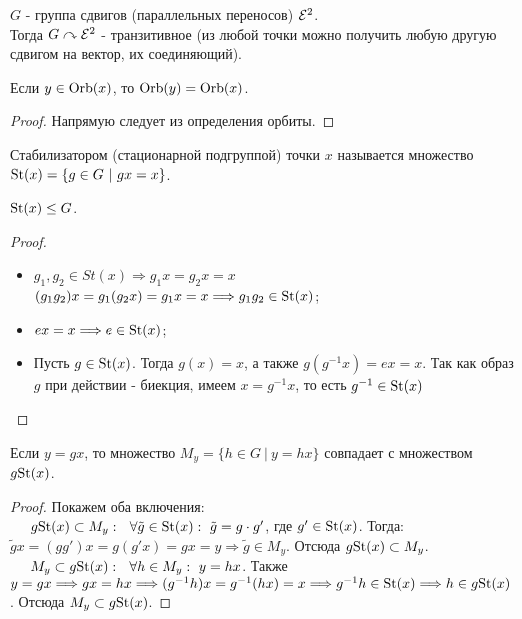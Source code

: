 \begin{example}
    $G$ - группа сдвигов (параллельных переносов) $\mathcal{E}^2$.\\
    Тогда $G \curvearrowright \mathcal{E}^2$ - транзитивное (из любой точки можно получить любую другую сдвигом на вектор, их соединяющий).
\end{example}
\begin{subtheorem}
    Если $y \in \textup{Orb}(x)$, то $\textup{Orb}(y) = \textup{Orb}(x)$.
\end{subtheorem}
\begin{proof}
    Напрямую следует из определения орбиты.
\end{proof}
\begin{definition}
    Стабилизатором (стационарной подгруппой) точки $x$ называется множество $\textup{St}(x) = \{g \in G \ | \ gx = x\}$.
\end{definition}
\begin{subtheorem}
    $\textup{St}(x) \leq G$.
\end{subtheorem}
\begin{proof}\tab
    \begin{itemize}
        \item $g_1, g_2 \in St(x) \Longrightarrow g_1x = g_2x = x$\\
        $(g_1g_2)x = g_1(g_2x) = g_1x = x \Longrightarrow g_1g_2 \in \textup{St}(x)$;
        \item $ex = x \Longrightarrow e \in \textup{St}(x)$;
        \item Пусть $g \in \textup{St}(x)$. Тогда $g(x) = x$, а также $g(g^{-1}x) = ex = x$. Так как образ $g$ при действии - биекция, имеем $x = g^{-1}x$, то есть $g^{-1} \in \textup{St}(x)$
    \end{itemize}    
\end{proof}
\begin{subtheorem}
    Если $y = gx$, то множество $M_y = \{h \in G \ | \ y = hx\}$ совпадает с множеством $g\textup{St}(x)$.
\end{subtheorem}
\begin{proof}
    Покажем оба включения:\\
    $\tab g \textup{St}(x) \subset M_y: \ \ \forall \tilde{g} \in \textup{St}(x): \ \tilde{g} = g\cdot g'$, где $g' \in \textup{St}(x)$. Тогда: $\tilde{g}x = (gg')x = g(g'x) = gx = y \Longrightarrow \tilde{g} \in M_y$. Отсюда $g \textup{St}(x) \subset M_y$.\\
    $\tab M_y \subset g \textup{St}(x): \ \ \forall h \in M_y: \ y = hx$. Также $y = gx \Longrightarrow gx = hx \Longrightarrow (g^{-1}h)x = g^{-1}(hx) = x \Longrightarrow g^{-1}h \in \textup{St}(x) \Longrightarrow h \in g \textup{St}(x)$. Отсюда $M_y \subset g \textup{St}(x)$.
\end{proof}
